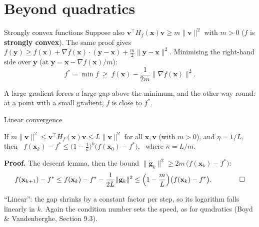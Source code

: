\documentclass[10pt]{wosm-slides}
\newcommand{\R}{\mathbb{R}}
\newcommand{\norm}[1]{\lVert #1 \rVert}
\newcommand{\vx}{\mathbf{x}}
\newcommand{\vy}{\mathbf{y}}
\newcommand{\vg}{\mathbf{g}}
\newcommand{\vh}{\mathbf{h}}
\DeclareRobustCommand{\vv}{\mathbf{v}}
\begin{document}
\section{Beyond quadratics}


\begin{frame}{Strongly convex functions}
  Suppose also $\vv^\top H_f(\vx)\vv \ge m\norm{\vv}^2$ with $m > 0$ ($f$ is \textbf{strongly convex}).
  The same proof gives $f(\vy) \ge f(\vx) + \nabla f(\vx)\cdot(\vy - \vx) + \frac m2 \norm{\vy - \vx}^2$.
  \pause
  Minimising the right-hand side over $\vy$ (at $\vy = \vx - \nabla f(\vx)/m$):
  \[ f^* = \min f \ \ge\ f(\vx) - \frac{1}{2m}\norm{\nabla f(\vx)}^2 . \]
  {\small A large gradient forces a large gap above the minimum, and the other way round: at a point
  with a small gradient, $f$ is close to $f^*$.\par}
\end{frame}

\begin{frame}{Linear convergence}
  \begin{theorem}
    If $m\norm{\vv}^2 \le \vv^\top H_f(\vx)\vv \le L\norm{\vv}^2$ for all $\vx, \vv$ (with $m > 0$), and
    $\eta = 1/L$, then \
    $f(\vx_k) - f^* \le \bigl(1 - \frac1\kappa\bigr)^k \bigl(f(\vx_0) - f^*\bigr)$, \ where $\kappa = L/m$.
  \end{theorem}
  \pause
  \textbf{Proof.} The descent lemma, then the bound $\norm{\vg_k}^2 \ge 2m\,\bigl(f(\vx_k) - f^*\bigr)$:
  \[ f(\vx_{k+1}) - f^* \le f(\vx_k) - f^* - \frac{1}{2L}\norm{\vg_k}^2
     \le \Bigl(1 - \frac mL\Bigr)\bigl(f(\vx_k) - f^*\bigr) . \qquad \qed \]
  \pause
  {\small ``Linear'': the gap shrinks by a constant factor per step, so its logarithm falls
  linearly in $k$. Again the condition number sets the speed, as for quadratics (Boyd \&
  Vandenberghe, Section 9.3).\par}
\end{frame}
\end{document}
